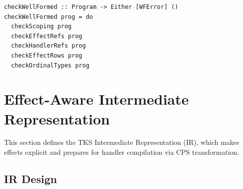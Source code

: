 \begin{verbatim}
checkWellFormed :: Program -> Either [WFError] ()
checkWellFormed prog = do
  checkScoping prog
  checkEffectRefs prog
  checkHandlerRefs prog
  checkEffectRows prog
  checkOrdinalTypes prog
\end{verbatim}

\section{Effect-Aware Intermediate Representation}
\label{sec:effect-aware-ir}

This section defines the TKS Intermediate Representation (IR), which makes effects explicit and prepares for handler compilation via CPS transformation.

\subsection{IR Design}
\label{subsec:ir-design}

